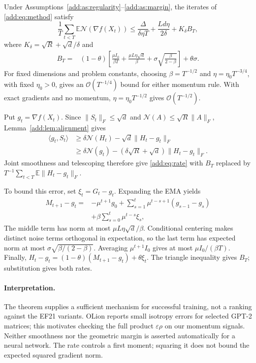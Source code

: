 \begin{theorem}
\label{add:thm:signmuon}
Under Assumptions~\ref{add:as:regularity}--\ref{add:as:margin},
the iterates of \eqref{add:eq:method} satisfy
\begin{equation}\label{add:eq:rate}
 \frac1T\sum_{t<T}\mathbb E\mathcal N(\nabla f(X_t))
 \le\frac{\Delta}{\delta\eta T}+\frac{Ld\eta}{2\delta}
       +K_\delta B_T,
\end{equation}
where $K_\delta=\sqrt R+\sqrt d/\delta$ and
\begin{align*}
 B_T={}&(1-\theta)\left[
 \frac{\mu I_0}{\beta T}
 +\frac{\mu L\eta\sqrt d}{\beta}
 +\sigma\sqrt{\frac{\beta}{2-\beta}}\right]
 +\theta\sigma.
\end{align*}
For fixed dimensions and problem constants, choosing
$\beta=T^{-1/2}$ and $\eta=\eta_0T^{-3/4}$, with fixed $\eta_0>0$,
gives an $\mathcal O(T^{-1/4})$ bound for either momentum rule. With exact
gradients and no momentum, $\eta=\eta_0T^{-1/2}$ gives
$\mathcal O(T^{-1/2})$.
\end{theorem}
\begin{paperproof}
Put $g_t=\nabla f(X_t)$. Since $\|S_t\|_F\le\sqrt d$ and
$\mathcal N(A)\le\sqrt R\|A\|_F$, Lemma~\ref{add:lem:alignment} gives
\begin{align*}
 \langle g_t,S_t\rangle
 &\ge\delta\mathcal N(H_t)-\sqrt d\|H_t-g_t\|_F\\
 &\ge\delta\mathcal N(g_t)
       -(\delta\sqrt R+\sqrt d)\|H_t-g_t\|_F.
\end{align*}
Joint smoothness and telescoping therefore give \eqref{add:eq:rate}
with $B_T$ replaced by $T^{-1}\sum_{t<T}\mathbb E\|H_t-g_t\|_F$.

To bound this error, set $\xi_t=G_t-g_t$. Expanding the EMA yields
\begin{align*}
 M_{t+1}-g_t={}&-\mu^{t+1}g_0
 +\sum_{s=1}^t\mu^{t-s+1}(g_{s-1}-g_s)\\
 &+\beta\sum_{s=0}^t\mu^{t-s}\xi_s,
\end{align*}
The middle term has norm at most
$\mu L\eta\sqrt d/\beta$.
Conditional centering makes distinct noise terms orthogonal in expectation,
so the last term has expected norm at most
$\sigma\sqrt{\beta/(2-\beta)}$.
Averaging $\mu^{t+1}I_0$ gives at most $\mu I_0/(\beta T)$.
Finally,
$H_t-g_t=(1-\theta)(M_{t+1}-g_t)+\theta\xi_t$.
The triangle inequality gives $B_T$; substitution gives both rates.
\end{paperproof}

\paragraph{Interpretation.}
The theorem supplies a sufficient mechanism for successful training, not a
ranking against the EF21 variants. OLion reports small isotropy errors for
selected GPT-2 matrices; this motivates checking the full product
$\varepsilon\rho$ on our momentum signals. Neither smoothness nor the
geometric margin is asserted automatically for a neural network.
The rate controls a first moment; squaring it does not bound the expected
squared gradient norm.

